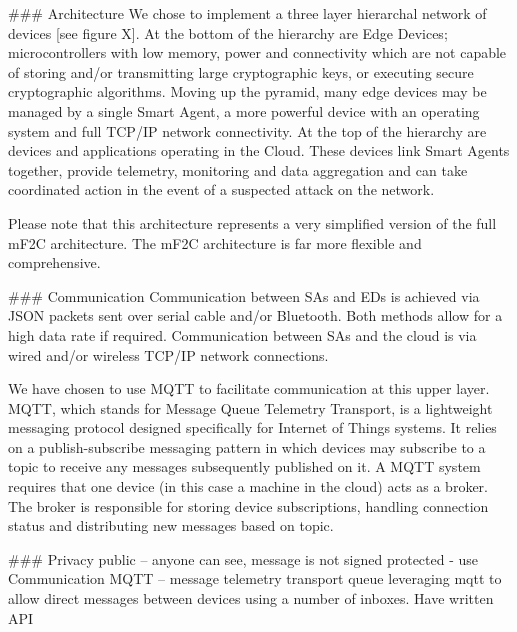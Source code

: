 ### Architecture
We chose to implement a three layer hierarchal network of devices [see figure X]. At the bottom of the hierarchy are Edge Devices; microcontrollers with low memory, power and connectivity which are not capable of storing and/or transmitting large cryptographic keys, or executing secure cryptographic algorithms. Moving up the pyramid, many edge devices may be managed by a single Smart Agent, a more powerful device with an operating system and full TCP/IP network connectivity. At the top of the hierarchy are devices and applications operating in the Cloud. These devices link Smart Agents together, provide telemetry, monitoring and data aggregation and can take coordinated action in the event of a suspected attack on the network.

Please note that this architecture represents a very simplified version of the full mF2C architecture. The mF2C architecture is far more flexible and comprehensive. 

### Communication
Communication between SAs and EDs is achieved via JSON packets sent over serial cable and/or Bluetooth. Both methods allow for a high data rate if required. Communication between SAs and the cloud is via wired and/or wireless TCP/IP network connections.
 
We have chosen to use MQTT to facilitate communication at this upper layer. MQTT, which stands for Message Queue Telemetry Transport, is a lightweight messaging protocol designed specifically for Internet of Things systems. It relies on a publish-subscribe messaging pattern in which devices may subscribe to a topic to receive any messages subsequently published on it. A MQTT system requires that one device (in this case a machine in the cloud) acts as a broker. The broker is responsible for storing device subscriptions, handling connection status and distributing new messages based on topic.

### Privacy
public – anyone can see, message is not signed
protected - use
Communication
MQTT – message telemetry transport queue
leveraging mqtt to allow direct messages between devices using a number of inboxes. Have written API
